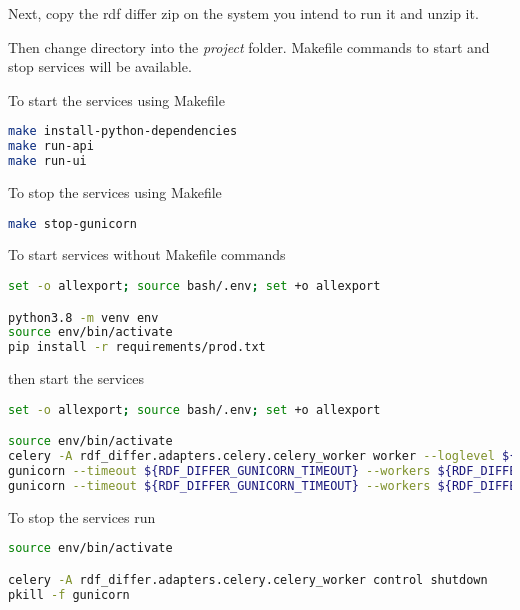 Next, copy the rdf differ zip on the system you intend to run it and unzip it.

Then change directory into the \textit{project} folder. Makefile commands to start and stop services will be available. 	

To start the services using Makefile

\begin{lstlisting}[language=bash,]
make install-python-dependencies
make run-api
make run-ui
\end{lstlisting}

To stop the services using Makefile

\begin{lstlisting}[language=bash,]
make stop-gunicorn
\end{lstlisting}

To start services without Makefile commands

\begin{lstlisting}[language=bash,]
set -o allexport; source bash/.env; set +o allexport

python3.8 -m venv env
source env/bin/activate
pip install -r requirements/prod.txt
\end{lstlisting}

then start the services

\begin{lstlisting}[language=bash,]
set -o allexport; source bash/.env; set +o allexport

source env/bin/activate
celery -A rdf_differ.adapters.celery.celery_worker worker --loglevel ${RDF_DIFFER_LOG_LEVEL} --logfile ${RDF_DIFFER_CELERY_LOGS} --detach
gunicorn --timeout ${RDF_DIFFER_GUNICORN_TIMEOUT} --workers ${RDF_DIFFER_GUNICORN_API_WORKERS} --bind 0.0.0.0:${RDF_DIFFER_API_PORT} --reload rdf_differ.entrypoints.api.run:app --log-file ${RDF_DIFFER_API_LOGS} --log-level ${RDF_DIFFER_LOG_LEVEL} --daemon
gunicorn --timeout ${RDF_DIFFER_GUNICORN_TIMEOUT} --workers ${RDF_DIFFER_GUNICORN_UI_WORKERS} --bind 0.0.0.0:${RDF_DIFFER_UI_PORT} --reload rdf_differ.entrypoints.ui.run:app --log-file ${RDF_DIFFER_UI_LOGS} --log-level ${RDF_DIFFER_LOG_LEVEL} --daemon
\end{lstlisting}

To stop the services run

\begin{lstlisting}[language=bash,]
source env/bin/activate

celery -A rdf_differ.adapters.celery.celery_worker control shutdown
pkill -f gunicorn
\end{lstlisting}

